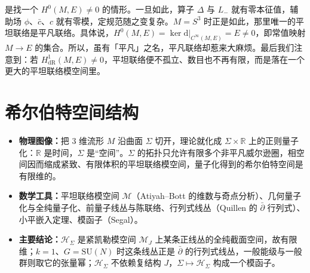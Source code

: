 \documentclass[11pt,a4paper]{article}
\newcommand{\R}{\mathbb{R}}
\newcommand{\dd}{\mathrm{d}}
\newcounter{yizhu}
\newif\ifshowkey
\newenvironment{keytakeaways}{%
    \par\medskip
    \ifshowkey
    \begin{tcolorbox}[enhanced,
        colback=blue!3!white, colframe=blue!35!black,
        boxrule=0.5pt, arc=2pt, left=6pt, right=6pt, top=4pt, bottom=4pt,
        title={\small\textbf{本节重点}\quad{\footnotesize（译者所加）}},
        fonttitle=\bfseries, coltitle=black, colbacktitle=blue!10!white,
        toptitle=1pt, bottomtitle=1pt]
    \else
        \setbox\yizhubox\vbox\bgroup
    \fi
}{%
    \ifshowkey
        \end{tcolorbox}%
    \else
        \egroup
    \fi
    \par\medskip
}
\begin{document}
是找一个 $H^0(M,E)\neq0$ 的情形。一旦如此，算子 $\Delta$ 与 $L_-$ 就有零本征值，辅助场 $\phi$、$\bar c$、$c$ 就有零模，定规范随之变复杂。$M=S^3$ 时正是如此，那里唯一的平坦联络是平凡联络。具体说，$H^0(M,E)=\ker\dd|_{C^\infty(M,E)}=E\neq0$，即常值映射 $M\to E$ 的集合。所以，虽有「平凡」之名，平凡联络却惹来大麻烦。最后我们注意到：若 $H^1_{\mathrm{dR}}(M,E)\neq0$，平坦联络便不孤立、数目也不再有限，而是落在一个更大的平坦联络模空间里。


\section{希尔伯特空间结构}\label{sec:4}

\begin{keytakeaways}
\begin{itemize}[leftmargin=1.4em,itemsep=2pt,topsep=2pt]
  \item \textbf{物理图像：}把 3 维流形 $M$ 沿曲面 $\Sigma$ 切开，理论就化成 $\Sigma\times\R$ 上的正则量子化：$\R$ 是时间，$\Sigma$ 是“空间”。$\Sigma$ 的拓扑只允许有限多个非平凡威尔逊圈，相空间因而缩成紧致、有限体积的平坦联络模空间，量子化得到的希尔伯特空间是有限维的。
  \item \textbf{数学工具：}平坦联络模空间 $\mathcal{M}$（Atiyah--Bott 的维数与奇点分析）、几何量子化与全纯量子化、前量子线丛与陈联络、行列式线丛（Quillen 的 $\bar\partial$ 行列式）、小平嵌入定理、模函子（Segal）。
  \item \textbf{主要结论：}$\mathcal{H}_\Sigma$ 是紧凯勒模空间 $\mathcal{M}_J$ 上某条正线丛的全纯截面空间，故有限维；$k=1$、$G=\mathrm{SU}(N)$ 时这条线丛正是 $\bar\partial$ 的行列式线丛，一般能级与一般群则取它的张量幂；$\mathcal{H}_\Sigma$ 不依赖复结构 $J$，$\Sigma\mapsto\mathcal{H}_\Sigma$ 构成一个模函子。
\end{itemize}
\end{keytakeaways}
\end{document}
